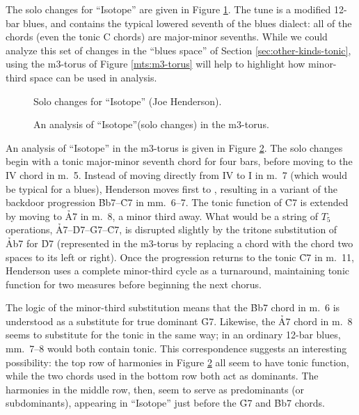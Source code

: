 The solo changes for ``Isotope'' are given in Figure
\ref{mts:isotope-solo-changes}. The tune is a modified 12-bar blues,
and contains the typical lowered seventh of the blues dialect: all of the
chords (even the tonic C chords) are major-minor sevenths. While we could
analyze this set of changes in the ``blues \tf space'' of Section
\ref{sec:other-kinds-tonic}, using the m3-torus of Figure \ref{mts:m3-torus}
will help to highlight how minor-third space can be used in analysis.

\begin{figure}[tbp]
  \caption{Solo changes for ``Isotope'' (Joe Henderson).}
  \label{mts:isotope-solo-changes}
\end{figure}

\begin{figure}[tbp]
  \caption{An analysis of ``Isotope''(solo changes) in the m3-torus.}
  \label{mts:isotope-torus}
\end{figure}

An analysis of ``Isotope'' in the m3-torus is given in Figure
\ref{mts:isotope-torus}. The solo changes begin with a tonic major-minor
seventh chord for four bars, before moving to the IV chord in m.~5. Instead of
moving directly from IV to I in m.~7 (which would be typical for a blues),
Henderson moves first to \Bflat, resulting in a variant of the backdoor
progression \h{Bb7}--\h{C7} in mm.~6--7.  The tonic function of \h{C7} is
extended by moving to \h{A7} in m.~8, a minor
third away. What would be a string of $T_5$ operations,
\h{A7}--\h{D7}--\h{G7}--\h{C7}, is disrupted slightly by the tritone
substitution of \h{Ab7} for \h{D7} (represented in the m3-torus by replacing a
chord with the chord two spaces to its left or right). Once the progression
returns to the tonic \h{C7} in m.~11, Henderson uses a complete minor-third
cycle as a turnaround, maintaining tonic function for two measures before
beginning the next chorus.

The logic of the minor-third substitution means that the \h{Bb7} chord in m.~6
is understood as a substitute for true dominant \h{G7}. Likewise, the \h{A7}
chord in m.~8 seems to substitute for the tonic in the same way; in an
ordinary 12-bar blues, mm.~7--8 would both contain tonic. This correspondence
suggests an interesting possibility: the top row of harmonies in Figure
\ref{mts:isotope-torus} all seem to have tonic function, while the two chords
used in the bottom row both act as dominants. The harmonies in the middle row,
then, seem to serve as predominants (or subdominants), appearing in
``Isotope'' just before the \h{G7} and \h{Bb7} chords.

